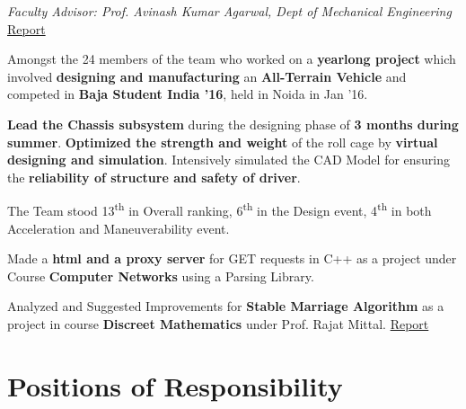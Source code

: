 \documentclass[a4paper]{norm-resume}
\begin{document}
    \vspace{1mm}

    	
    \emph{Faculty Advisor: Prof. Avinash Kumar Agarwal, Dept of Mechanical Engineering} \hfill \small \href{https://tulsyan.github.io/files/projects/B16ChassisDesignReport.pdf}{Report}
    \vspace{1mm}
    \begin{tightitemize}
    \small
    {
    \item Amongst the 24 members of the team who worked on a \textbf{yearlong project} which involved \textbf{designing and manufacturing} an \textbf{All-Terrain Vehicle} and competed in \textbf{Baja Student India ’16}, held in Noida in Jan ’16.
    \item \textbf{Lead the Chassis subsystem} during the designing phase of \textbf{3 months during summer}. \textbf{Optimized the strength and weight} of the roll cage by \textbf{virtual designing and simulation}. Intensively simulated the CAD Model for ensuring the \textbf{reliability of structure and safety of driver}.
    }
    \item The Team stood 13\textsuperscript{th} in Overall ranking, 6\textsuperscript{th} in the Design event, 4\textsuperscript{th} in both Acceleration and Maneuverability event.
    \end{tightitemize}

    \vspace{2mm}


    \vspace{1mm}
    \begin{tightitemize}
    \small
    {
    \item Made a \textbf{html and a proxy server} for GET requests in C++ as a project under Course \textbf{Computer Networks} using a Parsing Library.
    \item Analyzed and Suggested Improvements for \textbf{Stable Marriage Algorithm} as a project in course \textbf{Discreet Mathematics} under Prof. Rajat Mittal. \hfill \href{https://tulsyan.github.io/files/projects/CS201ProjectReport.pdf}{Report}
    }
    \end{tightitemize}


\section{Positions of Responsibility \hrulefill}
\end{document}
